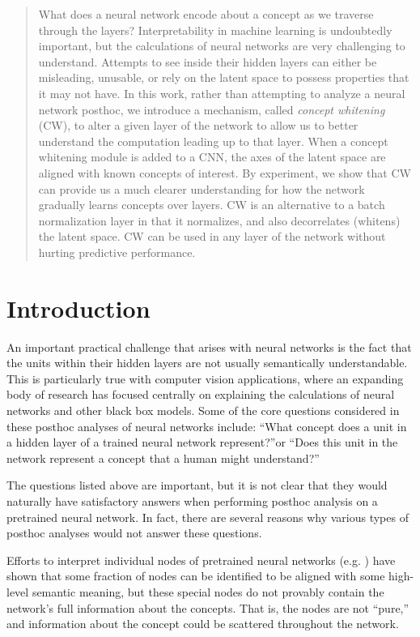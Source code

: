 \documentclass{article}
\begin{document}
\begin{abstract}
What does a neural network encode about a concept as we traverse through the layers? Interpretability in machine learning is undoubtedly important, but the calculations of neural networks are very challenging to understand. Attempts to see inside their hidden layers can either be misleading, unusable, or rely on the latent space to possess properties that it may not have. In this work, rather than attempting to analyze a neural network posthoc, we introduce a mechanism, called \textit{concept whitening} (CW), to alter a given layer of the network to allow us to better understand the computation leading up to that layer. When a concept whitening module is added to a CNN, the axes of the latent space are aligned with known concepts of interest. By experiment, we show that CW can provide us a much clearer understanding for how the network gradually learns concepts over layers. CW is an alternative to a batch normalization layer in that it normalizes, and also decorrelates (whitens) the latent space. CW can be used in any layer of the network without hurting predictive performance.
\end{abstract}

\section{Introduction} \label{sec:introduction}
An important practical challenge that arises with neural networks is the fact that the units within their hidden %
layers are not usually semantically understandable. This is particularly true with computer vision applications, where an expanding body of research has focused centrally on explaining the calculations of neural networks and other black box models. 
Some of the core questions considered in these posthoc analyses of neural networks include: ``What concept does a unit in a hidden layer of a trained neural network represent?''or ``Does this unit in the network represent a concept that a human might understand?'' 

The questions listed above are important, but it is not clear that they would naturally have satisfactory answers when performing posthoc analysis on a pretrained neural network. In fact, there are several reasons why various types of posthoc analyses would not answer these questions. 

Efforts to interpret individual nodes of pretrained neural networks  (e.g. \cite{zhou2018interpreting, zhou2014object}) have shown that some fraction of nodes can be identified to be aligned with some high-level semantic meaning, but these special nodes do not provably contain the network's full information about the concepts. That is, the nodes are not  ``pure,'' and information about the concept could be scattered throughout the network.
\end{document}
